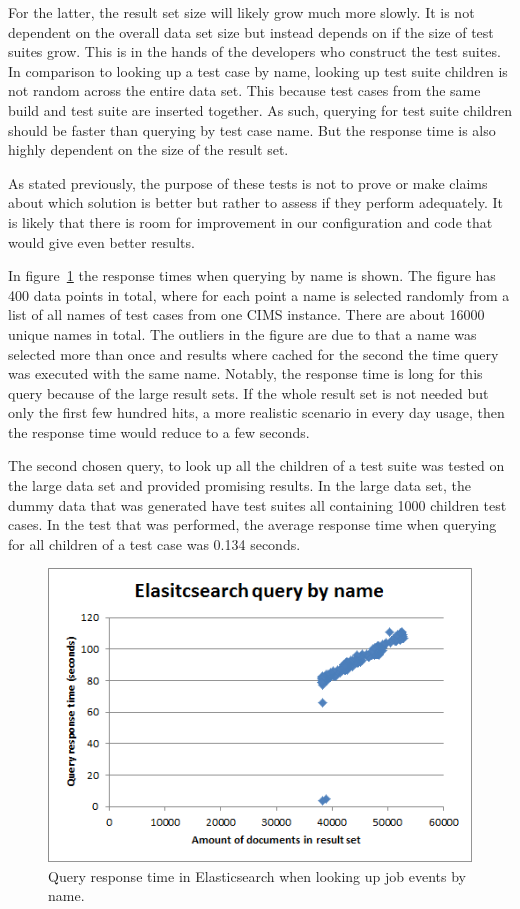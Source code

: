 For the latter, the result set size will likely grow much more slowly. It is not dependent on the overall data set size but instead depends on if the size of test suites grow. This is in the hands of the developers who construct the test suites. In comparison to looking up a test case by name, looking up test suite children is not random across the entire data set. This because test cases from the same build and test suite are inserted together. As such, querying for test suite children should be faster than querying by test case name. But the response time is also highly dependent on the size of the result set.

As stated previously, the purpose of these tests is not to prove or make claims about which solution is better but rather to assess if they perform adequately. It is likely that there is room for improvement in our configuration and code that would give even better results. 

In figure~\ref{fig:query_by_name} the response times when querying by name is shown. The figure has 400 data points in total, where for each point a name is selected randomly from a list of all names of test cases from one CIMS instance. There are about 16000 unique names in total. The outliers in the figure are due to that a name was selected more than once and results where cached for the second the time query was executed with the same name. Notably, the response time is long for this query because of the large result sets. If the whole result set is not needed but only the first few hundred hits, a more realistic scenario in every day usage, then the response time would reduce to a few seconds.

The second chosen query, to look up all the children of a test suite was tested on the large data set and provided promising results. In the large data set, the dummy data that was generated have test suites all containing 1000 children test cases. In the test that was performed, the average response time when querying for all children of a test case was 0.134 seconds.

\begin{figure}[h!]
\centering
\includegraphics[]{figure/es_by_name.png}
\caption{Query response time in Elasticsearch when looking up job events by name.}
\label{fig:query_by_name}
\end{figure}

